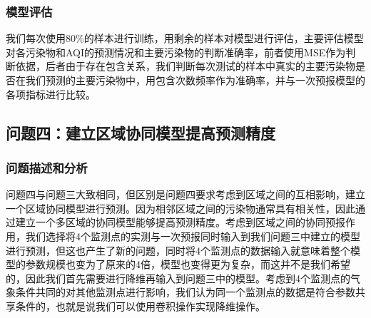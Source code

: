 \documentclass[bwprint]{gmcmthesis}
\numberwithin{figure}{section}
\begin{document}
\begin{table}[h!]
	\caption{污染物浓度及AQI预测结果}\label{tab: AQI_Pre}
	\begin{center}
	\end{center}
\end{table}
\subsubsection{模型评估}
我们每次使用80\%的样本进行训练，用剩余的样本对模型进行评估，主要评估模型对各污染物和AQI的预测情况和主要污染物的判断准确率，前者使用MSE作为判断依据，后者由于存在包含关系，我们判断每次测试的样本中真实的主要污染物是否在我们预测的主要污染物中，用包含次数频率作为准确率，并与一次预报模型的各项指标进行比较。

\subsection{问题四：建立区域协同模型提高预测精度}
\subsubsection{问题描述和分析}
问题四与问题三大致相同，但区别是问题四要求考虑到区域之间的互相影响，建立一个区域协同模型进行预测。因为相邻区域之间的污染物通常具有相关性，因此通过建立一个多区域的协同模型能够提高预测精度。考虑到区域之间的协同预报作用，我们选择将4个监测点的实测与一次预报同时输入到我们问题三中建立的模型进行预测，但这也产生了新的问题，同时将4个监测点的数据输入就意味着整个模型的参数规模也变为了原来的4倍，模型也变得更为复杂，而这并不是我们希望的，因此我们首先需要进行降维再输入到问题三中的模型。考虑到4个监测点的气象条件共同的对其他监测点进行影响，我们认为同一个监测点的数据是符合参数共享条件的，也就是说我们可以使用卷积操作实现降维操作。
\end{document}
